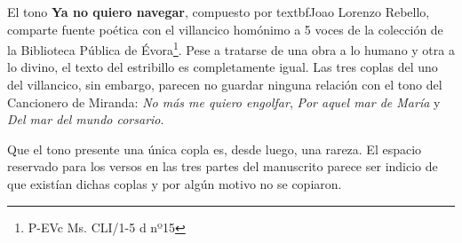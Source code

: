 El tono \textbf{Ya no quiero navegar}, compuesto por textbf{Joao Lorenzo Rebello}, comparte fuente poética con el villancico homónimo a 5 voces de la colección de la Biblioteca Pública de Évora\footnote{P-EVc Ms. CLI/1-5 d nº15}. Pese a tratarse de una obra a lo humano y otra a lo divino, el texto del estribillo es completamente igual. Las tres coplas del uno del villancico, sin embargo, parecen no guardar ninguna relación con el tono del Cancionero de Miranda: \textit{No más me quiero engolfar}, \textit{Por aquel mar de María} y \textit{Del mar del mundo corsario}. 

Que el tono presente una única copla es, desde luego, una rareza. El espacio reservado para los versos en las tres partes del manuscrito parece ser indicio de que existían dichas coplas y por algún motivo no se copiaron. 


